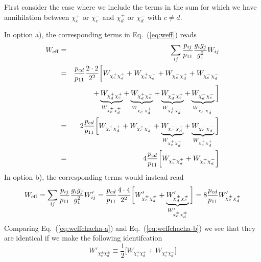 First consider the case where we include the terms in the sum for 
which we have annihilation between $\chi_{c}^+$ or $\chi_{c}^-$ and 
$\chi_{d}^+$ or $\chi_{d}^-$ with $c \ne d$.

In option a), the corresponding terms in Eq.~(\ref{eq:weff}) reads
\begin{eqnarray}
    W_{\rm eff} & = & \sum_{ij}\frac{p_{ij}}{p_{11}} 
    \frac{g_{i}g_{j}}{g_{1}^2} W_{ij} \nonumber \\
    & = &
    \frac{p_{cd}}{p_{11}} \frac{2 \cdot 2}{2^2}
    \bigg[ 
    W_{\chi_{c}^+ \chi_{d}^+} +
    W_{\chi_{c}^+ \chi_{d}^-} +
    W_{\chi_{c}^- \chi_{d}^+} +
    W_{\chi_{c}^- \chi_{d}^-} \nonumber \\
    & & +
    \underbrace{W_{\chi_{d}^+ \chi_{c}^+}}_{W_{\chi_{c}^+ \chi_{d}^+}} +
    \underbrace{W_{\chi_{d}^+ \chi_{c}^-}}_{W_{\chi_{c}^- \chi_{d}^+}} +
    \underbrace{W_{\chi_{d}^- \chi_{c}^+}}_{W_{\chi_{c}^+ \chi_{d}^-}} +
    \underbrace{W_{\chi_{d}^- \chi_{c}^-}}_{W_{\chi_{c}^- \chi_{d}^-}}
    \bigg] \nonumber \\
    & = & 
    2 \frac{p_{cd}}{p_{11}}
    \bigg[
    W_{\chi_{c}^+ \chi_{d}^+} +
    W_{\chi_{c}^+ \chi_{d}^-} +
    \underbrace{W_{\chi_{c}^- \chi_{d}^+}}_{W_{\chi_{c}^+ \chi_{d}^-}} +
    \underbrace{W_{\chi_{c}^- \chi_{d}^-}}_{W_{\chi_{c}^+ \chi_{d}^+}}
    \bigg] \nonumber \\
    & = & 
    4 \frac{p_{cd}}{p_{11}}
    \bigg[
    W_{\chi_{c}^+ \chi_{d}^+} +
    W_{\chi_{c}^+ \chi_{d}^-}
    \bigg]
    \label{eq:weffchacha-a}
\end{eqnarray}
In option b), the corresponding terms would instead read
\begin{equation}
    W_{\rm eff} = \sum_{ij}\frac{p_{ij}}{p_{11}} 
    \frac{g_{i}g_{j}}{g_{1}^2} W'_{ij} =
    \frac{p_{cd}}{p_{11}} \frac{4 \cdot 4}{2^2}
    \bigg[ 
    W'_{\chi_{c}^\pm \chi_{d}^\pm} +
    \underbrace{W'_{\chi_{d}^\pm \chi_{c}^\pm}}_{W'_{\chi_{c}^\pm \chi_{d}^\pm}}
    \bigg]
     = 8 \frac{p_{cd}}{p_{11}} W'_{\chi_{c}^\pm \chi_{d}^\pm}
    \label{eq:weffchacha-b}
\end{equation}
Comparing Eq.~(\ref{eq:weffchacha-a}) and Eq.~(\ref{eq:weffchacha-b}) 
we see that they are identical if we make the following identifcation
\begin{equation}
    W'_{\chi_{c}^\pm \chi_{d}^\pm} \equiv \frac{1}{2} 
        \bigg[
    W_{\chi_{c}^+ \chi_{d}^+} +
    W_{\chi_{c}^+ \chi_{d}^-}
    \bigg]
\end{equation} 


